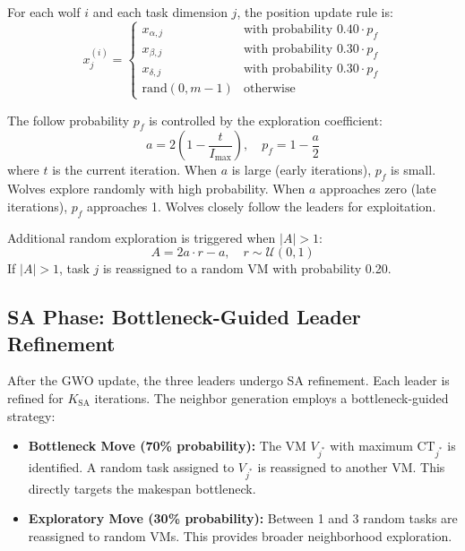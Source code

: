 \documentclass[conference]{IEEEtran}
\begin{document}
For each wolf $i$ and each task dimension $j$, the position update rule is:
\begin{equation}
    x_j^{(i)} =
    \begin{cases}
        x_{\alpha,j} & \text{with probability } 0.40 \cdot p_f \\
        x_{\beta,j}  & \text{with probability } 0.30 \cdot p_f \\
        x_{\delta,j} & \text{with probability } 0.30 \cdot p_f \\
        \text{rand}(0, m{-}1) & \text{otherwise}
    \end{cases}
    \label{eq:gwo_update}
\end{equation}

The follow probability $p_f$ is controlled by the exploration coefficient:
\begin{equation}
    a = 2 \left(1 - \frac{t}{I_{\max}}\right), \quad p_f = 1 - \frac{a}{2}
    \label{eq:exploration}
\end{equation}
where $t$ is the current iteration.
When $a$ is large (early iterations), $p_f$ is small.
Wolves explore randomly with high probability.
When $a$ approaches zero (late iterations), $p_f$ approaches 1.
Wolves closely follow the leaders for exploitation.

Additional random exploration is triggered when $|A| > 1$:
\begin{equation}
    A = 2a \cdot r - a, \quad r \sim \mathcal{U}(0, 1)
    \label{eq:coeff_a}
\end{equation}
If $|A| > 1$, task $j$ is reassigned to a random VM with probability 0.20.


\subsection{SA Phase: Bottleneck-Guided Leader Refinement}

After the GWO update, the three leaders undergo SA refinement.
Each leader is refined for $K_{\text{SA}}$ iterations.
The neighbor generation employs a bottleneck-guided strategy:

\begin{itemize}
    \item \textbf{Bottleneck Move (70\% probability):}
    The VM $V_{j^*}$ with maximum $\text{CT}_{j^*}$ is identified.
    A random task assigned to $V_{j^*}$ is reassigned to another VM.
    This directly targets the makespan bottleneck.

    \item \textbf{Exploratory Move (30\% probability):}
    Between 1 and 3 random tasks are reassigned to random VMs.
    This provides broader neighborhood exploration.
\end{itemize}
\end{document}
